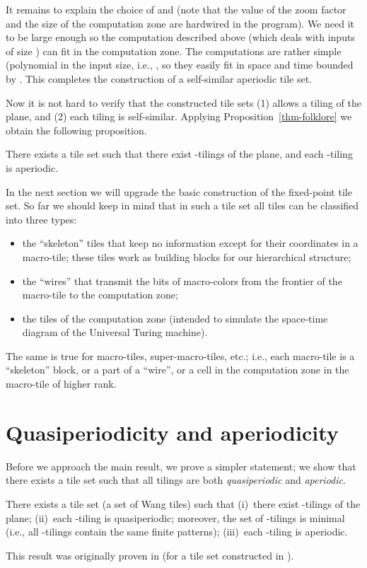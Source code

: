 \documentclass[runningheads]{llncs}
\begin{document}
It remains to explain the choice of  and  (note that the value of the zoom factor  and the size of the computation zone  are hardwired in the program). We need it to be large enough so the computation described above   (which deals with inputs of size ) can fit in the computation zone. The computations are rather simple (polynomial in the input size, i.e., , so they easily fit in space and time bounded by .
This completes the construction of a self-similar aperiodic tile set.
 
Now it is not hard to verify that the constructed tile sets (1) allows a tiling of the plane, and (2) each tiling is self-similar. Applying Proposition~\ref{thm-folklore} we obtain the following proposition.
\begin{proposition}[R.~Berger]
There exists a tile set  such that 
there exist -tilings of the plane, and each -tiling is  aperiodic.
\end{proposition}
 In the next section we will upgrade the basic construction of the fixed-point tile set. So far we should keep in mind that in such a tile set all tiles can be classified into three types:
 \begin{itemize}
 \item the ``skeleton'' tiles that keep no information except for their coordinates in a macro-tile; these tiles work as building blocks for our hierarchical structure;
 \item the ``wires'' that transmit the bits of macro-colors from the frontier of the macro-tile to the computation zone;
 \item the tiles of the computation zone (intended to simulate the space-time diagram of the Universal Turing machine). 
 \end{itemize}
 The same is true for macro-tiles, super-macro-tiles, etc.; i.e., each macro-tile is a  ``skeleton'' block, or a part of a ``wire'', or a cell in the computation zone in the macro-tile of higher rank.

 \section{Quasiperiodicity and aperiodicity}

Before we approach the main result, we prove a simpler statement; we show that there exists a tile set such that all tilings are both
\emph{quasiperiodic} and \emph{aperiodic}.
\begin{theorem}\label{thm2}
There exists a tile set \textup(a set of Wang tiles\textup)  such that 
(i)~there exist -tilings of the plane;
(ii)~each -tiling is quasiperiodic; moreover, the set of -tilings is minimal \textup(i.e., all -tilings contain the same finite patterns\textup);
(iii)~each -tiling is  aperiodic.

\end{theorem}
This result was originally proven in \cite{alexis} (for a tile set  constructed in \cite{ollinger}). 
\end{document}
